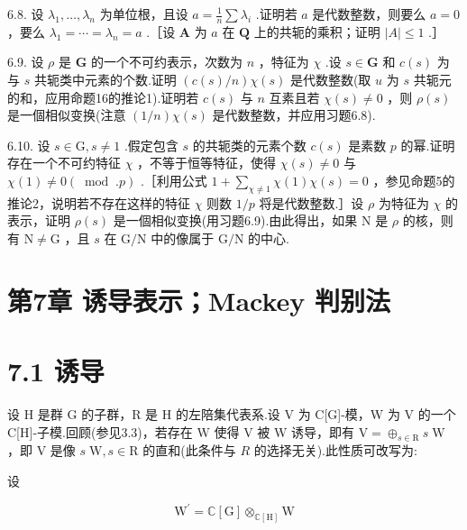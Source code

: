 \documentclass[10pt]{article}
\begin{document}
6.8. 设 \({\lambda }_{1},\ldots ,{\lambda }_{n}\) 为单位根，且设 \(a = \frac{1}{n}\sum {\lambda }_{i}\) .证明若 \(a\) 是代数整数，则要么 \(a = 0\) ，要么 \({\lambda }_{1} = \cdots  = {\lambda }_{n} = a\) .［设 \(\mathbf{A}\) 为 \(a\) 在 \(\mathbf{Q}\) 上的共轭的乘积；证明 \(\left| A\right|  \leq  1\) .］

6.9. 设 \(\rho\) 是 \(\mathbf{G}\) 的一个不可约表示，次数为 \(n\) ，特征为 \(\chi\) .设 \(s \in  \mathbf{G}\) 和 \(c\left( s\right)\) 为与 \(s\) 共轭类中元素的个数.证明 \(\left( {c\left( s\right) /n}\right) \chi \left( s\right)\) 是代数整数(取 \(u\) 为 \(s\) 共轭元的和，应用命题16的推论1).证明若 \(c\left( s\right)\) 与 \(n\) 互素且若 \(\chi \left( s\right)  \neq  0\) ，则 \(\rho \left( s\right)\) 是一個相似变换(注意 \(\left( {1/n}\right) \chi \left( s\right)\) 是代数整数，并应用习题6.8).

6.10. 设 \(s \in  \mathrm{G},s \neq  1\) .假定包含 \(s\) 的共轭类的元素个数 \(c\left( s\right)\) 是素数 \(p\) 的幂.证明存在一个不可约特征 \(\chi\) ，不等于恒等特征，使得 \(\chi \left( s\right)  \neq  0\) 与 \(\chi \left( 1\right)  \neq  0\left( {\;\operatorname{mod}\;.p}\right)\) .［利用公式 \(1 + \mathop{\sum }\limits_{{\chi  \neq  1}}\chi \left( 1\right) \chi \left( s\right)  = 0\) ，参见命题5的推论2，说明若不存在这样的特征 \(\chi\) 则数 \(1/p\) 将是代数整数.］设 \(\rho\) 为特征为 \(\chi\) 的表示，证明 \(\rho \left( s\right)\) 是一個相似变换(用习题6.9).由此得出，如果 \(\mathrm{N}\) 是 \(\rho\) 的核，则有 \(\mathrm{N} \neq  \mathrm{G}\) ，且 \(s\) 在 \(\mathrm{G}/\mathrm{N}\) 中的像属于 \(\mathrm{G}/\mathrm{N}\) 的中心.

\section*{第7章 诱导表示；Mackey 判别法}

\section*{7.1 诱导}

设 H 是群 G 的子群，R 是 H 的左陪集代表系.设 V 为 C[G]-模，W 为 V 的一个 C[H]-子模.回顾(参见3.3)，若存在 \(\mathrm{W}\) 使得 V 被 \(\mathrm{W}\) 诱导，即有 \(\mathrm{V} = { \oplus  }_{s \in  \mathrm{R}}s\mathrm{\;W}\) ，即 \(\mathrm{V}\) 是像 \(s\mathrm{\;W},s \in  \mathrm{R}\) 的直和(此条件与 \(R\) 的选择无关).此性质可改写为:

设

\[
{\mathrm{W}}^{\prime } = \mathbb{C}\left\lbrack  \mathrm{G}\right\rbrack  { \otimes  }_{\mathbb{C}\left\lbrack  \mathrm{H}\right\rbrack  }\mathrm{W}
\]
\end{document}
